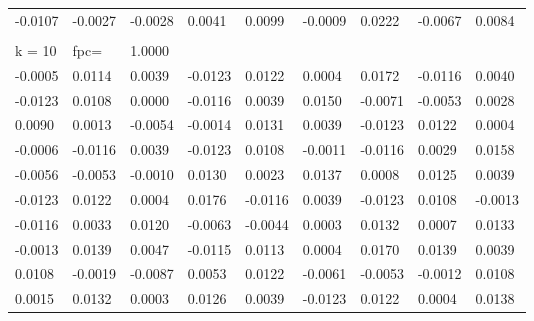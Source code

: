 \documentclass[letterpaper, 12pt]{article}
\begin{document}
\begin{table}[]
\begin{tabular}{lllllllll}
-0.0107 & -0.0027 & -0.0028 & 0.0041  & 0.0099  & -0.0009 & 0.0222  & -0.0067 & 0.0084  \\
        &         &         &         &         &         &         &         &         \\
k = 10  & fpc=    & 1.0000  &         &         &         &         &         &         \\
-0.0005 & 0.0114  & 0.0039  & -0.0123 & 0.0122  & 0.0004  & 0.0172  & -0.0116 & 0.0040  \\
-0.0123 & 0.0108  & 0.0000  & -0.0116 & 0.0039  & 0.0150  & -0.0071 & -0.0053 & 0.0028  \\
0.0090  & 0.0013  & -0.0054 & -0.0014 & 0.0131  & 0.0039  & -0.0123 & 0.0122  & 0.0004  \\
-0.0006 & -0.0116 & 0.0039  & -0.0123 & 0.0108  & -0.0011 & -0.0116 & 0.0029  & 0.0158  \\
-0.0056 & -0.0053 & -0.0010 & 0.0130  & 0.0023  & 0.0137  & 0.0008  & 0.0125  & 0.0039  \\
-0.0123 & 0.0122  & 0.0004  & 0.0176  & -0.0116 & 0.0039  & -0.0123 & 0.0108  & -0.0013 \\
-0.0116 & 0.0033  & 0.0120  & -0.0063 & -0.0044 & 0.0003  & 0.0132  & 0.0007  & 0.0133  \\
-0.0013 & 0.0139  & 0.0047  & -0.0115 & 0.0113  & 0.0004  & 0.0170  & 0.0139  & 0.0039  \\
0.0108  & -0.0019 & -0.0087 & 0.0053  & 0.0122  & -0.0061 & -0.0053 & -0.0012 & 0.0108  \\
0.0015  & 0.0132  & 0.0003  & 0.0126  & 0.0039  & -0.0123 & 0.0122  & 0.0004  & 0.0138 
\end{tabular}
\end{table}
\end{document}
